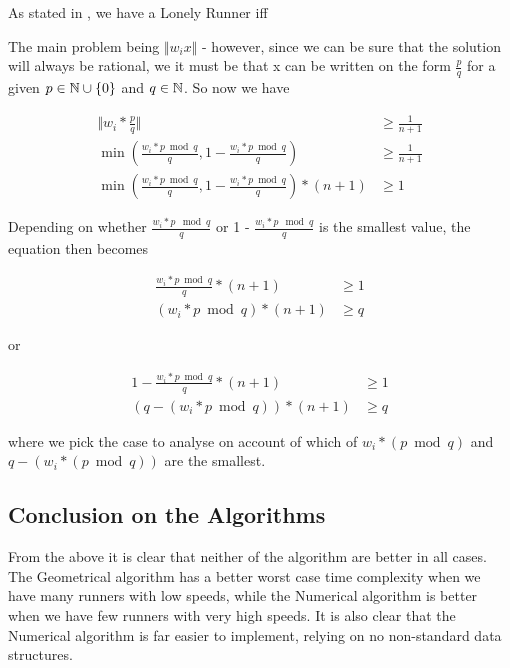 As stated in , we have a Lonely Runner iff

The main problem being $\Vert w_i x\Vert$ - however, since we can be sure that the solution will always be rational, we it must be that x can be written on the form $\frac{p}{q}$ for a given $p \in \mathbb{N}\cup\{0\}$ and $q \in \mathbb{N}$. So now we have

\begin{equation}
\label{compareRewriteOne}
\begin{split}
\Vert w_i * \frac{p}{q}\Vert &\geq \frac{1}{n+1}\\
\min(\frac{w_i * p \bmod q}{q}, 1 - \frac{w_i * p \bmod q}{q}) &\geq \frac{1}{n+1}\\
\min(\frac{w_i * p \bmod q}{q}, 1 - \frac{w_i * p \bmod q}{q}) * (n+1) &\geq 1
\end{split}
\end{equation}

Depending on whether $\frac{w_i * p \mod q}{q}$ or 1 - $\frac{w_i * p \mod q}{q}$ is the smallest value, the equation then becomes

\begin{equation}
\label{compareRewriteTwo}
\begin{split}
\frac{w_i * p \bmod q}{q} * (n+1) &\geq 1\\
(w_i * p \bmod q) * (n+1) &\geq q 
\end{split}
\end{equation}

or 

\begin{equation}
\label{compareRewriteThree}
\begin{split}
1 - \frac{w_i * p \bmod q}{q} * (n+1) &\geq 1\\
(q - (w_i * p \bmod q)) * (n+1) &\geq q
\end{split}
\end{equation}

where we pick the case to analyse on account of which of $w_i * (p \bmod q)$ and $q - (w_i * (p \bmod q))$ are the smallest.




\subsection{Conclusion on the Algorithms}

From the above it is clear that neither of the algorithm are better in all cases. The Geometrical algorithm has a better worst case time complexity when we have many runners with low speeds, while the Numerical algorithm is better when we have few runners with very high speeds. It is also clear that the Numerical algorithm is far easier to implement, relying on no non-standard data structures.

